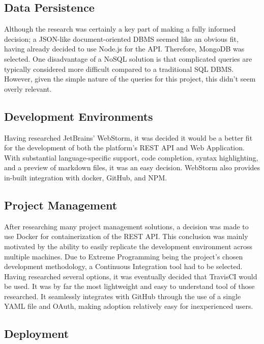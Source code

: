 \subsection{Data Persistence}
Although the research was certainly a key part of making a fully informed decision; a JSON-like document-oriented DBMS seemed like an obvious fit, having already decided to use Node.js for the API. Therefore, MongoDB was selected.  One disadvantage of a NoSQL solution is that complicated queries are typically considered more difficult compared to a traditional SQL DBMS. However, given the simple nature of the queries for this project, this didn't seem overly relevant. 

\subsection{Development Environments}
Having researched JetBrains' WebStorm, it was decided it would be a better fit for the development of both the platform's REST API and Web Application. With substantial language-specific support, code completion, syntax highlighting, and a preview of markdown files, it was an easy decision. WebStorm also provides in-built integration with docker, GitHub, and NPM.

\subsection{Project Management}
After researching many project management solutions, a decision was made to use Docker for containerization of the REST API. This conclusion was mainly motivated by the ability to easily replicate the development environment across multiple machines. Due to Extreme Programming being the project's chosen development methodology, a Continuous Integration tool had to be selected. Having researched several options, it was eventually decided that TravisCI would be used. It was by far the most lightweight and easy to understand tool of those researched. It seamlessly integrates with GitHub through the use of a single YAML file and OAuth, making adoption relatively easy for inexperienced users.

\subsection{Deployment}






